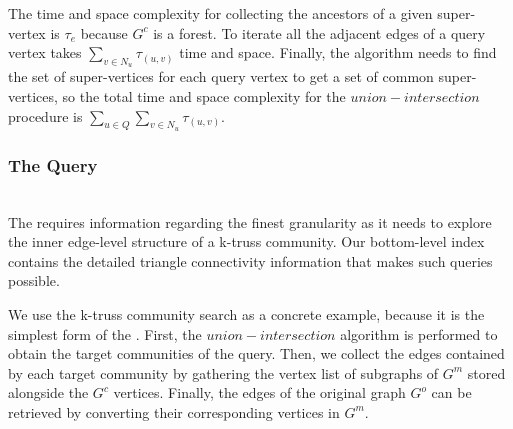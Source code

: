 The time and space complexity for collecting the ancestors of a given super-vertex is $\tau_e$ because $G^c$ is a forest. To iterate all the adjacent edges of a query vertex takes $\sum_{v \in N_u}{\tau_{(u,v)}}$ time and space. Finally, the algorithm needs to find the set of super-vertices for each query vertex to get a set of common super-vertices, so the total time and space complexity for the $union-intersection$ procedure is $\sum_{u \in Q}{\sum_{v \in N_u}{\tau_{(u,v)}}}$. 

\subsubsection{The \BottomLevelProb{} Query}
\label{\bottomlevelprob{}}

~\\The \bottomlevelprob{} \probdef{} requires information regarding the finest granularity as it needs to explore the inner edge-level structure of a k-truss community. Our bottom-level index contains the detailed triangle connectivity information that makes such queries possible. %

We use the k-truss community search as a concrete example, because it is the simplest form of the \bottomlevelprob{} \probdef{}. First, the $union-intersection$ algorithm is performed to obtain the target communities of the query. Then, we collect the edges contained by each target community by gathering the vertex list of subgraphs of $G^m$ stored alongside the $G^c$ vertices. Finally, the edges of the original graph $G^o$ can be retrieved by converting their corresponding vertices in $G^m$. 



